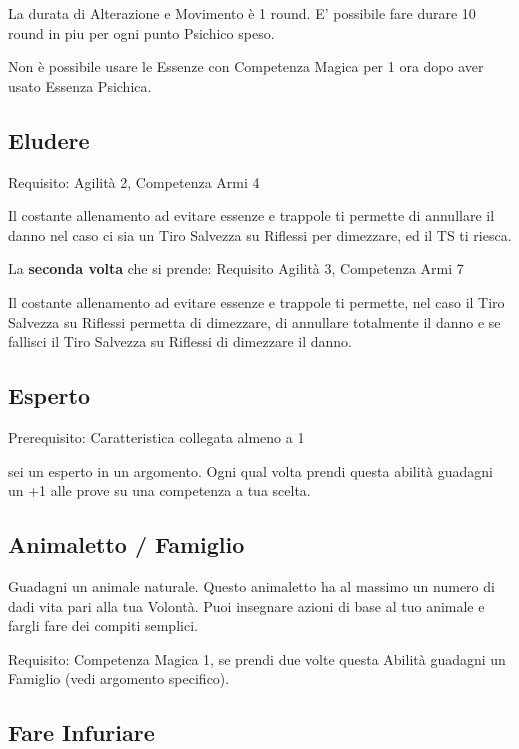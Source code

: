 \documentclass[a4paper,11pt,twoside,openany]{book}
\begin{document}
\bigskip

La durata di Alterazione e Movimento è 1 round. E' possibile fare durare 10 round in piu per ogni punto Psichico speso.

Non è possibile usare le Essenze con Competenza Magica per 1 ora dopo aver usato Essenza Psichica.

\subsection{Eludere}

Requisito: Agilità 2, Competenza Armi 4

Il costante allenamento ad evitare essenze e trappole ti permette di annullare il danno nel caso ci sia un Tiro Salvezza su Riflessi per dimezzare, ed il TS ti riesca.


La \textbf{seconda volta} che si prende: Requisito Agilità 3, Competenza Armi 7

Il costante allenamento ad evitare essenze e trappole ti permette, nel caso il Tiro Salvezza su Riflessi permetta di dimezzare, di annullare totalmente il danno e se fallisci il Tiro Salvezza su Riflessi di dimezzare il danno.

\subsection{Esperto}

Prerequisito: Caratteristica collegata almeno a 1

sei un esperto in un argomento. Ogni qual volta prendi questa abilità guadagni un +1 alle prove su una competenza a tua scelta.

\subsection{Animaletto / Famiglio}

Guadagni un animale naturale. Questo animaletto ha al massimo un numero di dadi vita pari alla tua Volontà. Puoi insegnare azioni di base al tuo animale e fargli fare dei compiti semplici.

Requisito: Competenza Magica 1, se prendi due volte questa Abilità guadagni un Famiglio (vedi argomento specifico).

\subsection{Fare Infuriare}
\end{document}

